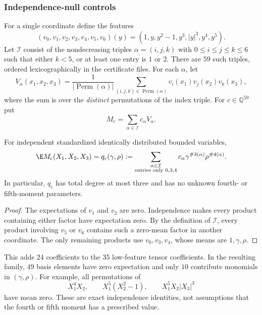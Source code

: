 \subsubsection{Independence-null controls}
For a single coordinate define the features
\begin{equation}\label{ms:finite:n3:eq:features}
 (v_0,v_1,v_2,v_3,v_4,v_5,v_6)(y)
 =(1,y,y^2-1,y^3,|y|^3,y^4,y^5).
\end{equation}
Let $\mathcal I$ consist of the nondecreasing triples
$\alpha=(i,j,k)$ with $0\le i\le j\le k\le6$ such that either
$k<5$, or at least one entry is $1$ or $2$. There are $59$ such triples,
ordered lexicographically in the certificate files.
For each $\alpha$, let
\[
 V_\alpha(x_1,x_2,x_3)
 =\frac1{|\operatorname{Perm}(\alpha)|}
   \sum_{(i,j,k)\in\operatorname{Perm}(\alpha)}
        v_i(x_1)v_j(x_2)v_k(x_3),
\]
where the sum is over the \emph{distinct} permutations of the index triple.
For $c\in\mathbb Q^{59}$ put
\begin{equation}\label{ms:finite:n3:eq:majorant}
 M_c=\sum_{\alpha\in\mathcal I}c_\alpha V_\alpha.
\end{equation}

\begin{lemma}\label{ms:finite:n3:lem:expect}
For independent standardized identically distributed bounded variables,
\begin{equation}\label{ms:finite:n3:eq:expect}
 \E M_c(X_1,X_2,X_3)=q_c(\gamma,\rho)
 :=\sum_{\substack{\alpha\in\mathcal I\\
                    \text{entries only }0,3,4}}
        c_\alpha\gamma^{\#3(\alpha)}\rho^{\#4(\alpha)}.
\end{equation}
In particular, $q_c$ has total degree at most three and has no unknown
fourth- or fifth-moment parameters.
\end{lemma}
\begin{proof}
The expectations of $v_1$ and $v_2$ are zero. Independence makes every
product containing either factor have expectation zero. By the definition
of $\mathcal I$, every product involving $v_5$ or $v_6$ contains such a
zero-mean factor in another coordinate. The only remaining products use
$v_0,v_3,v_4$, whose means are $1,\gamma,\rho$.
\end{proof}
This adds $24$ coefficients to the $35$ low-feature tensor coefficients.
In the resulting family, $49$ basis elements have zero expectation and
only $10$ contribute monomials in $(\gamma,\rho)$.
For example, all permutations of
\[
 X_1^4X_2,
 \qquad X_1^5(X_2^2-1),
 \qquad X_1^5X_2|X_3|^3
\]
have mean zero. These are exact independence identities, not assumptions
that the fourth or fifth moment has a prescribed value.

